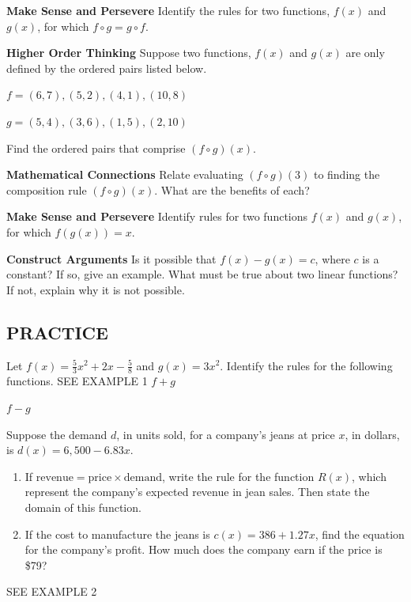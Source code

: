 \documentclass{article}
\newenvironment{practice}[2]{}{}
\begin{document}
\begin{practice}{15}{}
\textbf{Make Sense and Persevere} Identify the rules for two functions, $f(x)$ and $g(x)$, for which $f \circ g = g \circ f$.
\end{practice}

\begin{practice}{16}{}
\textbf{Higher Order Thinking} Suppose two functions, $f(x)$ and $g(x)$ are only defined by the ordered pairs listed below.

$f = (6, 7), (5, 2), (4, 1), (10, 8)$

$g = (5, 4), (3, 6), (1, 5), (2, 10)$

Find the ordered pairs that comprise $(f \circ g)(x)$.
\end{practice}

\begin{practice}{17}{}
\textbf{Mathematical Connections} Relate evaluating $(f \circ g)(3)$ to finding the composition rule $(f \circ g)(x)$. What are the benefits of each?
\end{practice}

\begin{practice}{18}{}
\textbf{Make Sense and Persevere} Identify rules for two functions $f(x)$ and $g(x)$, for which $f(g(x)) = x$.
\end{practice}

\begin{practice}{19}{}
\textbf{Construct Arguments} Is it possible that $f(x) - g(x) = c$, where $c$ is a constant? If so, give an example. What must be true about two linear functions? If not, explain why it is not possible.
\end{practice}

\subsection*{PRACTICE}

Let $f(x) = \frac{5}{3}x^2 + 2x - \frac{5}{8}$ and $g(x) = 3x^2$. Identify the rules for the following functions. \textsc{SEE EXAMPLE 1}
\begin{practice}{20}{}
$f + g$
\end{practice}

\begin{practice}{21}{}
$f - g$
\end{practice}

\begin{practice}{22}{}
Suppose the demand $d$, in units sold, for a company's jeans at price $x$, in dollars, is $d(x) = 6,500 - 6.83x$.
\begin{enumerate}
\item[\textbf{a.}] If $\text{revenue} = \text{price} \times \text{demand}$, write the rule for the function $R(x)$, which represent the company's expected revenue in jean sales. Then state the domain of this function.
\item[\textbf{b.}] If the cost to manufacture the jeans is $c(x) = 386 + 1.27x$, find the equation for the company's profit. How much does the company earn if the price is \$79?
\end{enumerate}
\textsc{SEE EXAMPLE 2}
\end{practice}
\end{document}
